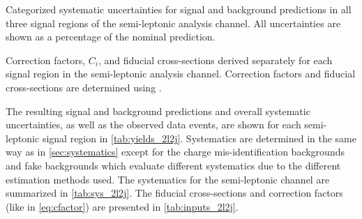 \begin{table}[ht!]
\centering

\caption{Categorized systematic uncertainties 
for signal and background predictions in all three signal regions
of the semi-leptonic analysis channel.
All uncertainties are shown as a percentage of the nominal
prediction.  }
\label{tab:sys_2l2j}
\end{table}

\begin{table}[ht!]
\centering

\caption{Correction factors, $C_i$, and fiducial cross-sections derived
separately for each signal region in the semi-leptonic analysis channel. 
Correction factors and  fiducial cross-sections are determined
using \madgraph.}
\label{tab:inputs_2l2j}
\end{table}

The resulting signal and background predictions and overall systematic uncertainties,
as well as the observed data events,
are shown for each semi-leptonic signal region in \tab\ref{tab:yields_2l2j}. Systematics
are determined in the same way as in \sec\ref{sec:systematics} except for the charge
mis-identification backgrounds and fake backgrounds which evaluate different systematics due
to the different estimation methods used. The systematics for the semi-leptonic
channel are summarized in \tab\ref{tab:sys_2l2j}. The fiducial cross-sections
and correction factors (like in \eqn\eqref{eq:cfactor}) are presented in \tab\ref{tab:inputs_2l2j}.


